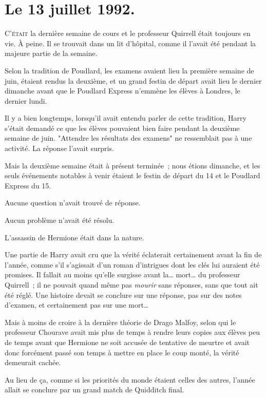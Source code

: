 
\section{Le 13 juillet 1992.}

\lettrine{C}{'était} la dernière semaine de cours et le professeur Quirrell était toujours en vie. À peine. Il se trouvait dans un lit d'hôpital, comme il l'avait été pendant la majeure partie de la semaine.

Selon la tradition de Poudlard, les examens avaient lieu la première semaine de juin, étaient rendus la deuxième, et un grand festin de départ avait lieu le dernier dimanche avant que le Poudlard Express n'emmène les élèves à Londres, le dernier lundi.

Il y a bien longtemps, lorsqu'il avait entendu parler de cette tradition, Harry s'était demandé ce que les élèves pouvaient bien faire pendant la deuxième semaine de juin. "Attendre les résultats des examens" ne ressemblait pas à une activité. La réponse l'avait surpris.

Mais la deuxième semaine était à présent terminée~; nous étions dimanche, et les seuls événements notables à venir étaient le festin de départ du 14 et le Poudlard Express du 15.

Aucune question n'avait trouvé de réponse.

Aucun problème n'avait été résolu.

L'assassin de Hermione était dans la nature.

Une partie de Harry avait cru que la vérité éclaterait certainement avant la fin de l'année, comme s'il s'agissait d'un roman d'intrigues dont les clés lui auraient été promises. Il fallait au moins qu'elle surgisse avant la… mort… du professeur Quirrell~; il ne pouvait quand même pas \emph{mourir} sans réponses, sans que tout ait été réglé. Une histoire devait se conclure sur une réponse, pas sur des notes d'examen, et certainement pas sur une mort…

Mais à moins de croire à la dernière théorie de Drago Malfoy, selon qui le professeur Chourave avait mis plus de temps à rendre leurs copies aux élèves peu de temps avant que Hermione ne soit accusée de tentative de meurtre et avait donc forcément passé son temps à mettre en place le coup monté, la vérité demeurait cachée.

Au lieu de ça, comme si les priorités du monde étaient celles des autres, l'année allait se conclure par un grand match de Quidditch final.

